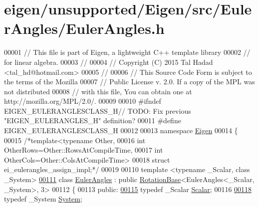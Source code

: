 \hypertarget{eigen_2unsupported_2_eigen_2src_2_euler_angles_2_euler_angles_8h_source}{}\section{eigen/unsupported/\+Eigen/src/\+Euler\+Angles/\+Euler\+Angles.h}
\label{eigen_2unsupported_2_eigen_2src_2_euler_angles_2_euler_angles_8h_source}

\begin{DoxyCode}
00001 \textcolor{comment}{// This file is part of Eigen, a lightweight C++ template library}
00002 \textcolor{comment}{// for linear algebra.}
00003 \textcolor{comment}{//}
00004 \textcolor{comment}{// Copyright (C) 2015 Tal Hadad <tal\_hd@hotmail.com>}
00005 \textcolor{comment}{//}
00006 \textcolor{comment}{// This Source Code Form is subject to the terms of the Mozilla}
00007 \textcolor{comment}{// Public License v. 2.0. If a copy of the MPL was not distributed}
00008 \textcolor{comment}{// with this file, You can obtain one at http://mozilla.org/MPL/2.0/.}
00009 
00010 \textcolor{preprocessor}{#ifndef EIGEN\_EULERANGLESCLASS\_H// TODO: Fix previous "EIGEN\_EULERANGLES\_H" definition?}
00011 \textcolor{preprocessor}{#define EIGEN\_EULERANGLESCLASS\_H}
00012 
00013 \textcolor{keyword}{namespace }\hyperlink{namespace_eigen}{Eigen}
00014 \{
00015   \textcolor{comment}{/*template<typename Other,}
00016 \textcolor{comment}{         int OtherRows=Other::RowsAtCompileTime,}
00017 \textcolor{comment}{         int OtherCols=Other::ColsAtCompileTime>}
00018 \textcolor{comment}{  struct ei\_eulerangles\_assign\_impl;*/}
00019 
00110   \textcolor{keyword}{template} <\textcolor{keyword}{typename} \_Scalar, \textcolor{keyword}{class} \_System>
\hyperlink{class_eigen_1_1_euler_angles}{00111}   \textcolor{keyword}{class }\hyperlink{class_eigen_1_1_euler_angles}{EulerAngles} : \textcolor{keyword}{public} \hyperlink{class_eigen_1_1_rotation_base}{RotationBase}<EulerAngles<\_Scalar, \_System>, 3>
00112   \{
00113     \textcolor{keyword}{public}:
\hyperlink{class_eigen_1_1_euler_angles_a2ab1d433ac9683268446f8905ac31aac}{00115}       \textcolor{keyword}{typedef} \_Scalar \hyperlink{class_eigen_1_1_euler_angles_a2ab1d433ac9683268446f8905ac31aac}{Scalar};
00116       
\hyperlink{class_eigen_1_1_euler_angles_a17e3dee5fef4af35bbb4e319c2cdc3c1}{00118}       \textcolor{keyword}{typedef} \_System \hyperlink{class_eigen_1_1_euler_angles_a17e3dee5fef4af35bbb4e319c2cdc3c1}{System};

\end{DoxyCode}
